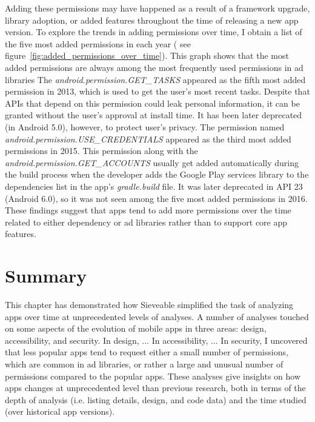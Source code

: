 Adding these permissions may have happened as a result of a framework upgrade, library adoption, or added features throughout the time of releasing a new app version.
To explore the trends in adding permissions over time, I obtain a list of the five most added permissions in each year ( see figure~\ref{fig:added_permissions_over_time}).
This graph shows that the most added permissions are always among the most frequently used permissions in ad libraries \cite{Liu_2015_MobiSys}
The \textit{android.permission.GET\_TASKS} appeared as the fifth most added permission in 2013, which is used to get the user's most recent tasks.
Despite that APIs that depend on this permission could leak personal information, it can be granted without the user's approval at install time.
It has been later deprecated (in Android 5.0), however, to protect user's privacy.
The permission named \textit{android.permission.USE\_CREDENTIALS} appeared as the third most added permissions in 2015.
This permission along with the \textit{android.permission.GET\_ACCOUNTS} usually get added automatically during the build process when the developer adds the Google Play services library to the dependencies list in the app's \textit{gradle.build} file.
It was later deprecated in API 23 (Android 6.0), so it was not seen among the five most added permissions in 2016.
These findings suggest that apps tend to add more permissions over the time related to either dependency or ad libraries rather than to support core app features.

\section{Summary}
This chapter has demonstrated how Sieveable simplified the task of analyzing apps over time at unprecedented levels of analyses.
A number of analyses touched on some aspects of the evolution of mobile apps in three areas: design, accessibility, and security.
In design, ...
In accessibility, ...
In security, I uncovered that less popular apps tend to request either a small number of permissions, which are common in ad libraries, or rather a large and unusual number of permissions compared to the popular apps.
These analyses give insights on how apps changes at unprecedented level than previous research, both in terms of the depth of analysis (i.e. listing details, design, and code data) and the time studied (over historical app versions).